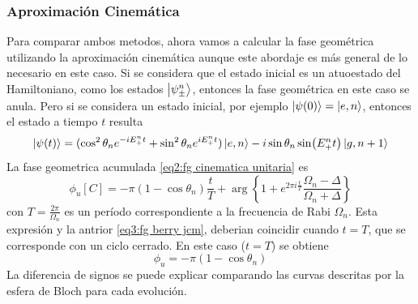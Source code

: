 \subsubsection{Aproximación Cinemática}
Para comparar ambos metodos, ahora vamos a calcular la fase geométrica utilizando la aproximación cinemática aunque este abordaje es más general de lo necesario en este caso.
Si se considera que el estado inicial es un atuoestado del Hamiltoniano, como los estados $\ket{\psi_\pm^n}$, entonces la fase geométrica en este caso se anula. Pero si se considera un estado inicial, por ejemplo $\ket{\psi(0)}=\ket{e,n}$, entonces el estado a tiempo $t$ resulta
\begin{equation}\label{eq3:fg berry jcm}
    \ket{\psi(t)}=(\cos^2\theta_ne^{-iE_+^nt}+\sin^2\theta_ne^{iE_+^nt})\ket{e,n}-i \sin\theta_n\sin(E_+^nt)\ket{g,n+1}
\end{equation}
La fase geometrica acumulada \ref{eq2:fg cinematica unitaria} es
\begin{equation}\label{eq3:fg unitaria jcm}
    \phi_u[C]=-\pi(1-\cos\theta_n)\frac{t}{T} +\arg\left\{ 1+e^{2\pi i \frac{t}{T}}\frac{\Omega_n-\Delta}{\Omega_n+\Delta} \right\}
\end{equation}
con $T=\frac{2\pi}{\Omega_n}$ es un período correspondiente a la frecuencia de Rabi $\Omega_n$. Esta expresión y la antrior \ref{eq3:fg berry jcm}, deberian coincidir cuando $t=T$, que se corresponde con un ciclo cerrado. En este caso ($t=T$) se obtiene
\begin{equation}
    \phi_u=-\pi(1-\cos\theta_n)
\end{equation}
La diferencia de signos se puede explicar comparando las curvas descritas por la esfera de Bloch para cada evolución. 

